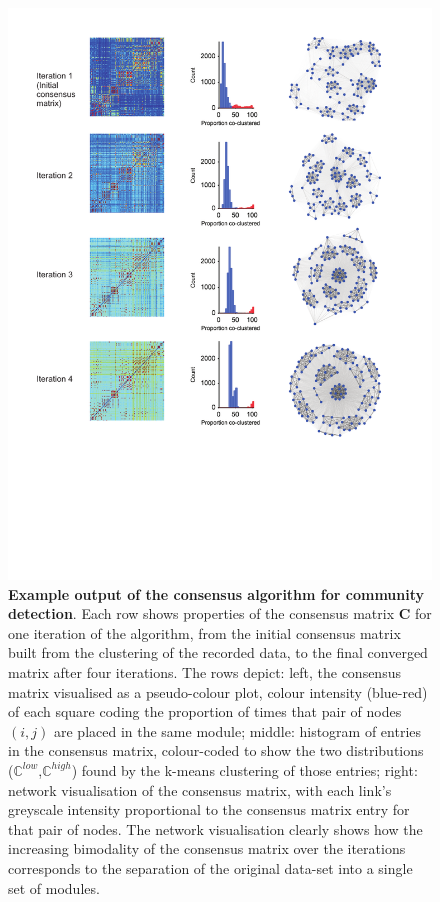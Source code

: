 \documentclass[11pt,a4paper]{article}
\begin{document}
\begin{figure}
\centering
\includegraphics{Figures/SI_Figure_Consensus}
\caption{\label{fig:consensus} {\bf Example output of the consensus algorithm for community detection}. Each row shows properties of the consensus matrix $\mathbf{C}$ for one iteration of the algorithm, from the initial consensus matrix built from the clustering of the recorded data, to the final converged matrix after four iterations. The rows depict: left, the consensus matrix visualised as a pseudo-colour plot, colour intensity (blue-red) of each square coding the proportion of times that pair of nodes $(i,j)$ are placed in the same module; middle: histogram of entries in the consensus matrix, colour-coded to show the two distributions ($\mathbb{C}^{low}$,$\mathbb{C}^{high}$) found by the k-means clustering of those entries; right: network visualisation of the consensus matrix, with each link's greyscale intensity proportional to the consensus matrix entry for that pair of nodes. The network visualisation clearly shows how the increasing bimodality of the consensus matrix over the iterations corresponds to the separation of the original data-set into a single set of modules.}
\end{figure}
\end{document}
